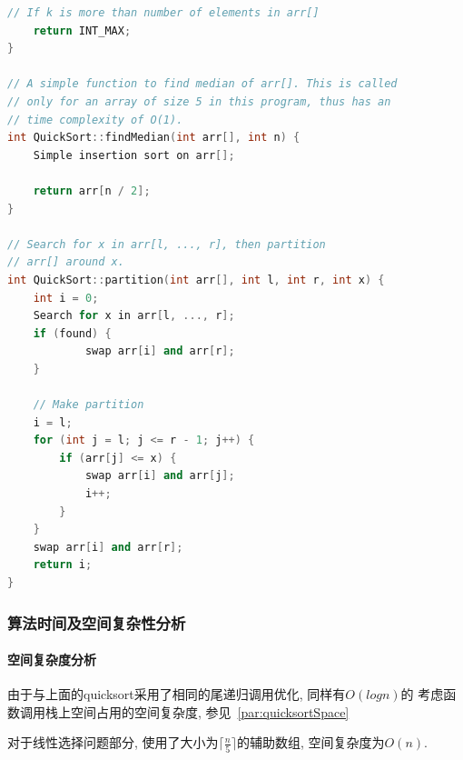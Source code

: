 \begin{lstlisting}[language=c++]
    // If k is more than number of elements in arr[]
    return INT_MAX;
}

// A simple function to find median of arr[]. This is called
// only for an array of size 5 in this program, thus has an
// time complexity of O(1).
int QuickSort::findMedian(int arr[], int n) {
  	Simple insertion sort on arr[];

    return arr[n / 2];
}

// Search for x in arr[l, ..., r], then partition
// arr[] around x.
int QuickSort::partition(int arr[], int l, int r, int x) {
    int i = 0;
    Search for x in arr[l, ..., r];
    if (found) {
			swap arr[i] and arr[r];
    }

    // Make partition
    i = l;
    for (int j = l; j <= r - 1; j++) {
        if (arr[j] <= x) {
            swap arr[i] and arr[j];
            i++;
        }
    }
  	swap arr[i] and arr[r];
    return i;
}
\end{lstlisting}

\subsubsection{算法时间及空间复杂性分析}
\paragraph{空间复杂度分析}
由于与上面的quicksort采用了相同的尾递归调用优化, 同样有$O(log{n})$的
考虑函数调用栈上空间占用的空间复杂度, 参见~\ref{par:quicksortSpace}\par
对于线性选择问题部分, 使用了大小为$\lceil\frac{n}{5}\rceil$的辅助数组,
空间复杂度为$O(n)$.


